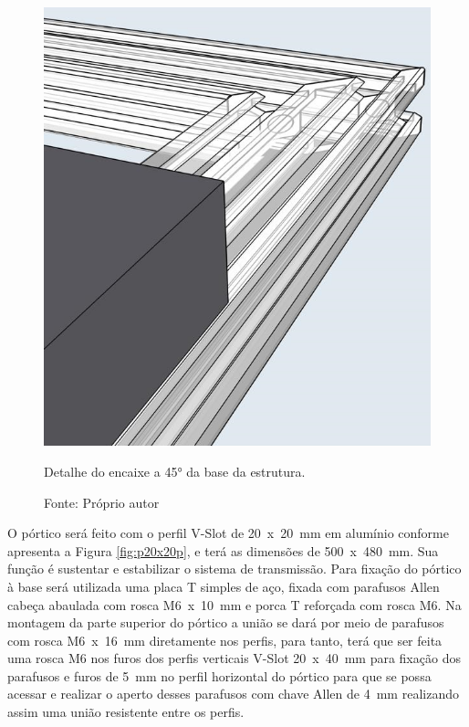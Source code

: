 \begin{figure}[H]
\centering
\includegraphics[scale = 0.5]{figuras/detalhe45}
\caption{Detalhe do encaixe a 45° da base da estrutura.}
\caption*{Fonte: Próprio autor}
\label{fig:detalhe45}
\end{figure}
    
O pórtico será feito com o perfil V-Slot de 20~x~20~mm em alumínio conforme apresenta 
a Figura \ref{fig:p20x20p}, e terá as dimensões de 500~x~480~mm. Sua função é sustentar 
e estabilizar o sistema de transmissão. Para fixação do pórtico à base será utilizada 
uma placa T simples de aço, fixada com parafusos Allen cabeça abaulada com rosca M6~x~10~mm 
e porca T reforçada com rosca M6. Na montagem da parte superior do pórtico a união 
se dará por meio de parafusos com rosca M6~x~16~mm diretamente nos perfis, para tanto, 
terá que ser feita uma rosca M6 nos furos dos perfis verticais V-Slot 20~x~40~mm para 
fixação dos parafusos e furos de 5~mm no perfil horizontal do pórtico para que se 
possa acessar e realizar o aperto desses parafusos com chave Allen de 4~mm realizando 
assim uma união resistente entre os perfis.


